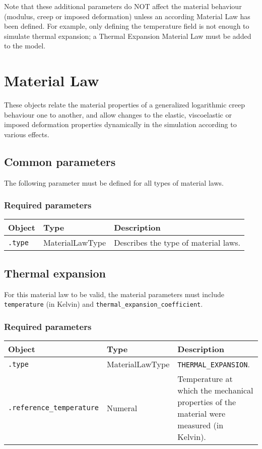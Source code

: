 \documentclass[10pt]{article}
\begin{document}
Note that these additional parameters do NOT affect the material behaviour (modulus, creep or imposed deformation) unless an according Material Law has been defined. For example, only defining the temperature field is not enough to simulate thermal expansion; a Thermal Expansion Material Law must be added to the model.

\section{Material Law}

These objects relate the material properties of a generalized logarithmic creep behaviour one to another, and allow changes to the elastic, viscoelastic or imposed deformation properties dynamically in the simulation according to various effects.

\subsection{Common parameters}

The following parameter must be defined for all types of material laws.

\subsubsection*{Required parameters}

\begin{tabularx}{\textwidth}{llX}
\hline 
Object & Type & Description \\ 
\hline 
\verb+.type+ & MaterialLawType & Describes the type of material laws. \\ 
\hline 
\end{tabularx}

\subsection{Thermal expansion}

For this material law to be valid, the material parameters must include \verb+temperature+ (in Kelvin) and \verb+thermal_expansion_coefficient+.

\subsubsection*{Required parameters}

\begin{tabularx}{\textwidth}{llX}
\hline 
Object & Type & Description \\ 
\hline 
\verb+.type+ & MaterialLawType & \verb+THERMAL_EXPANSION+. \\ 
\verb+.reference_temperature+ & Numeral & Temperature at which the mechanical properties of the material were measured (in Kelvin). \\ 
\hline 
\end{tabularx}
\end{document}

